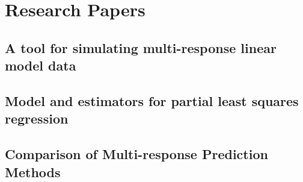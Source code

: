 \documentclass[11pt,a4paper,oneside,openright,titlepage,
  headinclude,footinclude,BCOR=5mm,
  numbers=noenddot,cleardoublepage=empty,
  tablecaptionabove, dottedtoc,
  bibliography=totoc]{scrreprt}
\begin{document}
\part*{Research Papers}
\par\chapter{A tool for simulating multi-response linear model data}

\par\chapter{Model and estimators for partial least squares regression}

\par\chapter{Comparison of Multi-response Prediction Methods}

% 
% 
% 

\end{document}
